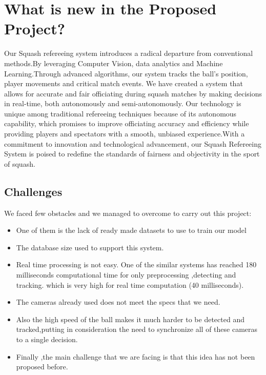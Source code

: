 \documentclass[12pt]{article}
\begin{document}
\section{What is new in the Proposed Project?}
Our Squash refereeing system introduces a radical departure from conventional methods.By leveraging Computer Vision, data analytics and Machine Learning.Through advanced algorithms, our system tracks the ball's position, player movements and critical match events. We have created a system that allows for accurate and fair officiating during squash matches by making decisions in real-time, both autonomously and semi-autonomously. Our technology is unique among traditional refereeing techniques because of its autonomous capability, which promises to improve officiating accuracy and efficiency while providing players and spectators with a smooth, unbiased experience.With a commitment to innovation and technological advancement, our Squash Refereeing System is poised to redefine the standards of fairness and objectivity in the sport of squash.

 \subsection{Challenges}
We faced few obstacles and we managed to overcome to carry out this project: 
\begin{itemize}
\item One of them is the lack of ready made datasets to use to train our model 

\item The database size used to support this system.

\item Real time processing is not easy. One of the similar systems has reached 180 milliseconds computational time for only preprocessing ,detecting and tracking. which is very high for real time computation (40 milliseconds).

\item The cameras already used does not meet the specs that we need. 

\item Also the high speed of the ball makes it much harder to be detected and tracked,putting in consideration the need to synchronize all of these cameras to a single decision.

\item Finally ,the main challenge that we are facing is that this idea has not been proposed before.
\end{itemize}
\end{document}
